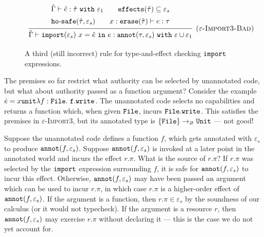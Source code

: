 \begin{figure}[h]

\[
\begin{array}{c}

\infer[\textsc{($\varepsilon$-Import3-Bad)}]
	{ \hat \Gamma \vdash \kwa{import}(\varepsilon_s)~x = \hat e~\kw{in} e: \kwa{annot}(\tau, \varepsilon_s)~\kw{with} \varepsilon \cup \varepsilon_1 }
{{\def\arraystretch{1.4}
  \begin{array}{c}
\hat \Gamma \vdash \hat e: \hat \tau~\kw{with} \varepsilon_1
~~~~~~
\kwa{effects}(\hat \tau) \subseteq \varepsilon_s \\
\hosafe{\hat \tau}{\varepsilon_s} ~~~~~~ x: \kwa{erase}(\hat \tau) \vdash e: \tau
  \end{array}}} 
 
\end{array}
\]

\vspace{-7pt}
\caption{A third (still incorrect) rule for type-and-effect checking $\mathtt{import}$ expressions.}
\label{fig:import_rule3}
\end{figure}

The premises so far restrict what authority can be selected by
unannotated code, but what about authority passed as a function
argument? Consider the example
$\hat e = {x}{\mathtt{unit}}{\lambda f: { \mathtt{File}
  }.~\mathtt{f.write}}$. The unannotated code selects no capabilities and
returns a function which, when given $\mathtt{File}$, incurs
$\mathtt{File.write}$. This satisfies the premises in
\textsc{$\varepsilon$-Import3}, but its annotated type is
$\{ \mathtt{File} \} \rightarrow_{\varnothing} \mathtt{Unit}$ --- not good!

Suppose the unannotated code defines a function $f$, which gets
annotated with $\varepsilon_s$ to produce
$\mathtt{annot}(f, \varepsilon_s)$. Suppose $\mathtt{annot}(f, \varepsilon_s)$ is
invoked at a later point in the annotated world and incurs the effect
$r.\pi$. What is the source of $r.\pi$? If $r.\pi$ was selected by the
$\mathtt{import}$ expression surrounding $f$, it is safe for
$\mathtt{annot}(f, \varepsilon_s)$ to incur this effect. Otherwise,
$\mathtt{annot}(f, \varepsilon_s)$ may have been passed an argument which can
be used to incur $r.\pi$, in which case $r.\pi$ is a higher-order
effect of $\mathtt{annot}(f, \varepsilon_s)$. If the argument is a function,
then $r.\pi \in \varepsilon_s$ by the soundness of our calculus (or it
would not typecheck). If the argument is a resource $r$, then
$\mathtt{annot}(f, \varepsilon_s)$ may exercise $r.\pi$ without declaring it
--- this is the case we do not yet account for.

